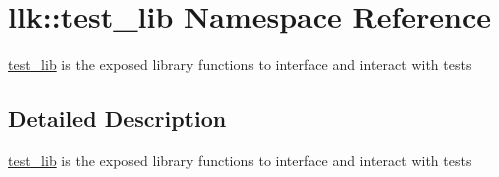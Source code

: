 \hypertarget{namespacellk_1_1test__lib}{}\section{llk\+:\+:test\+\_\+lib Namespace Reference}
\label{namespacellk_1_1test__lib}


\hyperlink{namespacellk_1_1test__lib}{test\+\_\+lib} is the exposed library functions to interface and interact with tests  




\subsection{Detailed Description}
\hyperlink{namespacellk_1_1test__lib}{test\+\_\+lib} is the exposed library functions to interface and interact with tests 